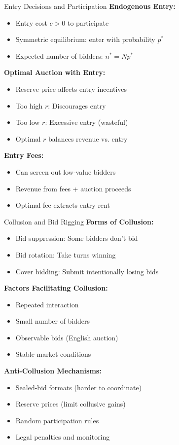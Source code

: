 \documentclass[xcolor={x11names}]{beamer}
\begin{document}
\begin{frame}{Entry Decisions and Participation}
\textbf{Endogenous Entry:}
\begin{itemize}
  \item Entry cost $c > 0$ to participate
  \item Symmetric equilibrium: enter with probability $p^*$
  \item Expected number of bidders: $n^* = Np^*$
\end{itemize}

\textbf{Optimal Auction with Entry:}
\begin{itemize}
  \item Reserve price affects entry incentives
  \item Too high $r$: Discourages entry
  \item Too low $r$: Excessive entry (wasteful)
  \item Optimal $r$ balances revenue vs. entry
\end{itemize}

\textbf{Entry Fees:}
\begin{itemize}
  \item Can screen out low-value bidders
  \item Revenue from fees + auction proceeds
  \item Optimal fee extracts entry rent
\end{itemize}
\end{frame}

\begin{frame}{Collusion and Bid Rigging}
\textbf{Forms of Collusion:}
\begin{itemize}
  \item Bid suppression: Some bidders don't bid
  \item Bid rotation: Take turns winning
  \item Cover bidding: Submit intentionally losing bids
\end{itemize}

\textbf{Factors Facilitating Collusion:}
\begin{itemize}
  \item Repeated interaction
  \item Small number of bidders
  \item Observable bids (English auction)
  \item Stable market conditions
\end{itemize}

\textbf{Anti-Collusion Mechanisms:}
\begin{itemize}
  \item Sealed-bid formats (harder to coordinate)
  \item Reserve prices (limit collusive gains)
  \item Random participation rules
  \item Legal penalties and monitoring
\end{itemize}
\end{frame}
\end{document}
